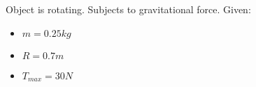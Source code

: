 

Object is rotating. Subjects to gravitational force.
Given: 

\begin{itemize}
    \item $  m  = 0.25kg $
    \item $ R = 0.7m $
    \item $ T_{max} = 30N $
\end{itemize}
